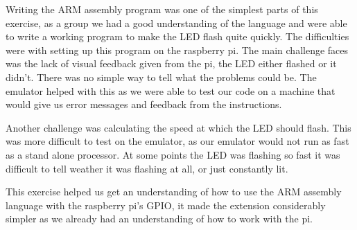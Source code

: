 Writing the ARM assembly program was one of the simplest parts of this exercise, as a group we had a good understanding of the language and were able to write a working program to make the LED flash quite quickly. The difficulties were with setting up this program on the raspberry pi. The main challenge faces was the lack of visual feedback given from the pi, the LED either flashed or it didn't. There was no simple way to tell what the problems could be. The emulator helped with this as we were able to test our code on a machine that would give us error messages and feedback from the instructions.

Another challenge was calculating the speed at which the LED should flash. This was more difficult to test on the emulator, as our emulator would not run as fast as a stand alone processor. At some points the LED was flashing so fast it was difficult to tell weather it was flashing at all, or just constantly lit. 

This exercise helped us get an understanding of how to use the ARM assembly language with the raspberry pi's GPIO, it made the extension considerably simpler as we already had an understanding of how to work with the pi.